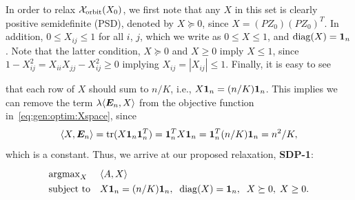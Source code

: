 In order to relax $\mathcal{X}_{\text{orbit}}{(}X_0)$, we first note that any $X$ in this set
is clearly positive semidefinite (PSD), denoted by $X \succeq 0$, since
$X = (PZ_0)(PZ_0)^T$. In addition, $0 \le X_{ij} \le 1$ for all $i$, $j$, which we
write as  $0 \le X \le 1$,  and $\operatorname{diag}(X) = \bm{1}_n$.  Note that the
latter condition, $X \succeq 0$ and $X \ge 0$ imply $X \le 1$, since $1-X_{ij}^2 = X_{ii} X_{jj} - X_{ij}^2 \ge 0$ implying $X_{ij} = |X_{ij}| \le 1$. Finally, it is easy to see

that each row of $X$ should sum to $n/K$, i.e.,  $X \bm{1}_n = (n/K) \bm{1}_n$.  This implies we can remove the term $\lambda \langle \bm{E}_n, X\rangle$ from the objective function in~\eqref{eq:gen:optim:Xspace}, since
\begin{align}\label{eq:X:Em}
	\langle X,\bm{E}_n\rangle = \operatorname*{tr}(X \bm{1}_n \bm{1}_n^T) = \bm{1}_n^T X \bm{1}_n = \bm{1}_n^T (n/K) \bm{1}_n = n^2/K,
\end{align}
which is a constant. Thus, we arrive at our proposed relaxation, {\bf SDP-1}:
\begin{align}\label{eq:our:sdp}
\begin{split}
  \def\arraystretch{1.3}
  \begin{array}{ll}
    \argmax_X & \ip{A,X}  \\
    \text{subject to} 
    & X \onev_n = (n/K) \onev_n, \; \; \diag(X) = \onev_n, \;\;
      X \succeq 0, \;X \ge 0  .  
  \end{array}
\end{split}
\end{align}
%



